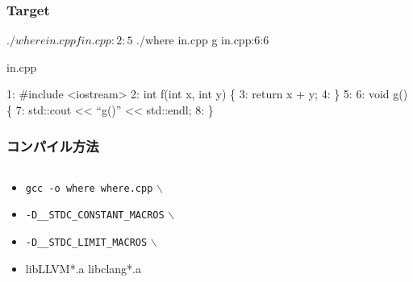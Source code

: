 \documentclass[12pt,xgraphicx=dvips,xcolor=dvips]{beamer}
\begin{document}
\begin{frame}[containsverbatim]
  \frametitle{Target}

  \begin{semiverbatim}
    $ ./where in.cpp f
      in.cpp:2:5

    $ ./where in.cpp g
      in.cpp:6:6
  \end{semiverbatim}

  \begin{exampleblock}{in.cpp}
    \begin{semiverbatim}
1: #include <iostream>
2: int f(int x, int y) \{
3:   return x + y;
4: \}
5:
6: void g() \{
7:  std::cout << ``g()'' << std::endl;
8: \}
    \end{semiverbatim}
  \end{exampleblock}
\end{frame}

\begin{frame}
  \frametitle{コンパイル方法}


  \begin{columns}
    \begin{column}{.55\textwidth}
      \begin{itemize}
        \setlength{\itemsep}{1.5zh}
      \item {\tt gcc -o where where.cpp} $\backslash$
      \item {\tt -D\_\_STDC\_CONSTANT\_MACROS} $\backslash$
      \item {\tt -D\_\_STDC\_LIMIT\_MACROS} $\backslash$
      \item libLLVM*.a libclang*.a
      \end{itemize}
    \end{column}

    \begin{column}[t]{.45\textwidth}
    \end{column}
  \end{columns}

\end{frame}
\end{document}
